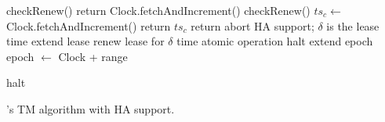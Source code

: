 \begin{algorithm}[htb]
\begin{algorithmic}[1]
{}
\State checkRenew()
\State return Clock.fetchAndIncrement()
\EndProcedure
\Statex
{}
\State checkRenew()
\State $ts_c \leftarrow$ Clock.fetchAndIncrement()
 \State return $ts_c$
 \Else
 \State return {\sc abort}
\EndIf
\EndProcedure
\Statex
%
 \Comment HA support;  $\delta$ is the lease time
 \label{l:lease-start} \Comment extend lease
 \State renew lease for $\delta$ time \Comment atomic operation
  halt \EndIf 
\EndIf  \label{l:lease-end}
  \label{l:epoch-start} \Comment extend epoch
\State epoch $\leftarrow$ Clock +  range
 
 halt \EndIf 
\EndIf  \label{l:epoch-end}
\EndProcedure

\end{algorithmic}
\caption{\sysll's TM algorithm with HA support.}
\label{alg:ha}
\end{algorithm}

